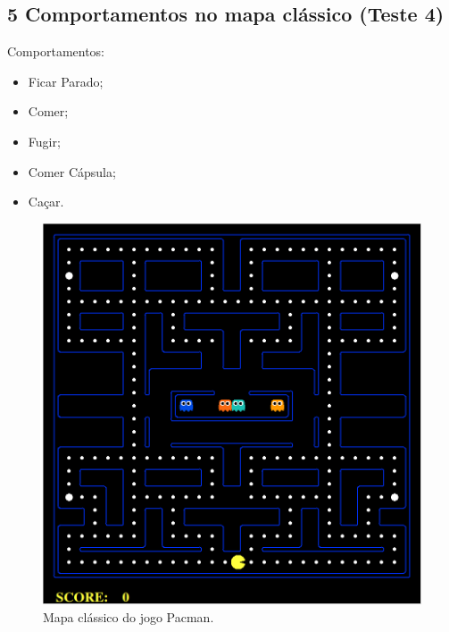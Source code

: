\documentclass{beamer}
\begin{document}

\subsection{5 Comportamentos no mapa clássico (Teste 4)}

\begin{frame}
Comportamentos:
\begin{itemize}
	\item Ficar Parado;
	\item Comer;
	\item Fugir;
	\item Comer Cápsula;
	\item Caçar.
\end{itemize}

\begin{figure}[h]
    \centering
    \includegraphics[height=0.5\textheight]{images/pacman_classical_map}
    \caption{Mapa clássico do jogo Pacman.}
\end{figure}
\end{frame}

\end{document}
